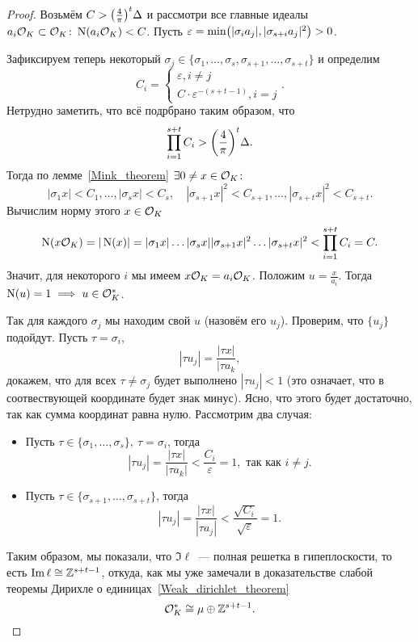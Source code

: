 \begin{proof}
	 Возьмём $C > \lr*{\frac{4}{\pi}}^t \Delta$ и рассмотри  все главные идеалы $a_i \mathcal{O}_{K} \subset \mathcal{O}_{K}\colon \operatorname{\mathrm{N}}(a_i \mathcal{O}_{K}) < C$. 
	 Пусть $\varepsilon = \min\lr*{|\sigma_i a_{j}|, |\sigma_{s + i} a_{j}|^2} > 0$.

	  Зафиксируем теперь некоторый $\sigma_j \in \{ \sigma_{1}, \ldots, \sigma_{s}, \sigma_{s + 1}, \ldots, \sigma_{s + t}\}$ и определим 
	  \[
	  	C_{i} = \begin{cases} \varepsilon, i \neq j \\  C \cdot \varepsilon^{-(s + t - 1)}, i = j\end{cases}.
	  \]
	  Нетрудно заметить, что всё подрбрано таким образом, что 
	  \[
	  		\prod_{i = 1}^{s + t} C_i > \lr*{\frac{4}{\pi}}^{t} \Delta.
	  \]
	  Тогда по лемме~\ref{Mink_theorem} $\exists 0 \neq x \in \mathcal{O}_{K}\colon $
	  \[
	  		|\sigma_{1}x| < C_1, \ldots, |\sigma_{s}x| < C_{s}, \quad |\sigma_{s + 1}x|^2 < C_{s + 1}, \ldots, |\sigma_{s + t}x|^2 < C_{s + t}.
	  \]
	  Вычислим норму этого $x \in \mathcal{O}_{K}$
	  \[
	  	\operatorname{\mathrm{N}}(x\mathcal{O}_{K}) = |\operatorname{\mathrm{N}}(x)|  = |\sigma_{1}x| \ldots |\sigma_{s}x| |\sigma_{s + 1}x|^2 \ldots |\sigma_{s + t}x|^2 < \prod_{i = 1}^{s + t} C_{i} = C. 
	  \]
	  Значит, для некоторого $i$ мы имеем $x \mathcal{O}_{K} = a_i \mathcal{O}_{K}$. Положим $u = \frac{x}{a_i}$. Тогда $\operatorname{\mathrm{N}}(u) = 1 \implies u \in \mathcal{O}_{K}^{*}$. 

	  Так для каждого $\sigma _j$ мы находим свой $u$ (назовём его $u_j$). Проверим, что $\{ u_j \}$ подойдут.  Пусть $\tau = \sigma_i$,
	  \[
	   	|\tau u_j| = \frac{|\tau x|}{|\tau a_k},
	   \] 
	   докажем, что для всех $\tau \neq \sigma_j$ будет выполнено $|\tau u_j| < 1$ (это означает, что в соотвествующей координате будет знак минус). Ясно, что этого будет достаточно, так как сумма координат равна нулю. Рассмотрим два случая: 
	   \begin{itemize}
	   	\item Пусть $\tau \in \{ \sigma_1, \ldots, \sigma_{s} \}, \ \tau = \sigma_i$, тогда 
	   	\[
	   		|\tau u_j| = \frac{|\tau x|}{|\tau a_k|} < \frac{C_i}{\varepsilon} = 1, \text{ так как } i \neq j.
	   	\]
	   	\item Пусть $\tau \in \{ \sigma_{s + 1}, \ldots, \sigma_{s + t} \}$, тогда 
	   	\[
	   		|\tau u_j| = \frac{|\tau x|}{|\tau a_j|} < \frac{\sqrt{C_i}}{\sqrt{\varepsilon}} = 1.
	   	\]
	   \end{itemize}

	   Таким образом, мы показали, что $\Im{\ell}$~--- полная решетка в гипеплоскости, то есть $\mathop{\mathrm{Im}}\nolimits{\ell} \cong \mathbb{Z}^{s + t - 1}$, откуда, как мы уже замечали в доказательстве слабой теоремы Дирихле о единицах~\ref{Weak_dirichlet_theorem}
	   \[
	   		\mathcal{O}_{K}^{*} \cong \mu \oplus \mathbb{Z}^{s + t - 1}.
	   \]
	  
	   \end{proof}
	  

